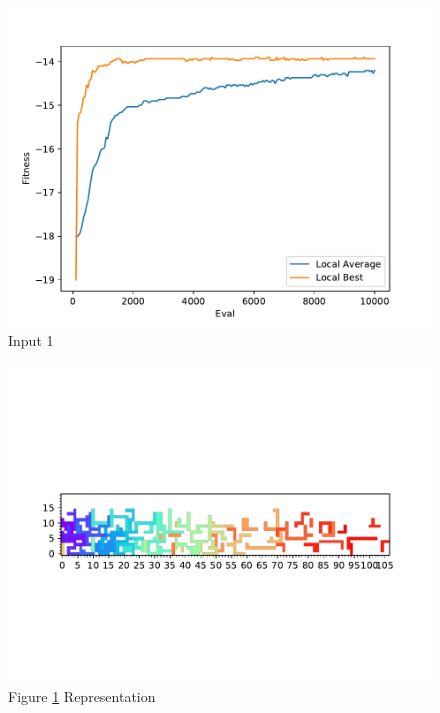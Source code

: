 \documentclass{standalone}
\begin{document}
\begin{figure}[!htb]
	\caption{Input 1}
	\label{fig:graph_1010}
	\includegraphics[width=\textwidth]{../graphs/graphs/1010.pdf}
\end{figure}


\begin{figure}[!htb]
	\caption{Figure \ref{fig:graph_1010} Representation}
	\label{fig:picture_1010}
	\includegraphics[width=\textwidth]{../graphs/picture/1010.pdf}
\end{figure}
\end{document}
